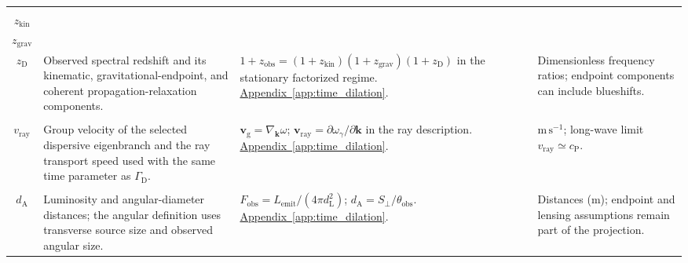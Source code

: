\begin{longtable}{@{} c p{5.5cm} p{4cm} p{3.5cm} @{}}
\begin{tabular}[c]{@{}c@{}}$z_{\mathrm{obs}}$ \\ $z_{\mathrm{kin}}$ \\ $z_{\mathrm{grav}}$ \\ $z_{\mathrm D}$\end{tabular} & {\raggedright Observed spectral redshift and its kinematic, gravitational-endpoint, and coherent propagation-relaxation components.\par} & {\raggedright $1+z_{\mathrm{obs}}=(1+z_{\mathrm{kin}})(1+z_{\mathrm{grav}})(1+z_{\mathrm D})$ in the stationary factorized regime. \newline \hyperref[app:time_dilation]{Appendix~\ref*{app:time_dilation}}.\par} & {\raggedright Dimensionless frequency ratios; endpoint components can include blueshifts.\par} \\

\begin{tabular}[c]{@{}c@{}}$v_{\mathrm g}$ \\ $v_{\mathrm{ray}}$\end{tabular} & {\raggedright Group velocity of the selected dispersive eigenbranch and the ray transport speed used with the same time parameter as $\Gamma_{\mathrm D}$.\par} & {\raggedright $\mathbf v_{\mathrm g}=\nabla_{\mathbf k}\omega$; $\mathbf v_{\mathrm{ray}}=\partial\omega_\gamma/\partial\mathbf k$ in the ray description. \newline \hyperref[app:time_dilation]{Appendix~\ref*{app:time_dilation}}.\par} & {\raggedright $\mathrm{m\,s^{-1}}$; long-wave limit $v_{\mathrm{ray}}\simeq c_{\mathrm P}$.\par} \\

\begin{tabular}[c]{@{}c@{}}$d_{\mathrm L}$ \\ $d_{\mathrm A}$\end{tabular} & {\raggedright Luminosity and angular-diameter distances; the angular definition uses transverse source size and observed angular size.\par} & {\raggedright $F_{\mathrm{obs}}=L_{\mathrm{emit}}/(4\pi d_{\mathrm L}^2)$; $d_{\mathrm A}=S_\perp/\theta_{\mathrm{obs}}$. \newline \hyperref[app:time_dilation]{Appendix~\ref*{app:time_dilation}}.\par} & {\raggedright Distances ($\mathrm m$); endpoint and lensing assumptions remain part of the projection.\par} \\


\end{longtable}
